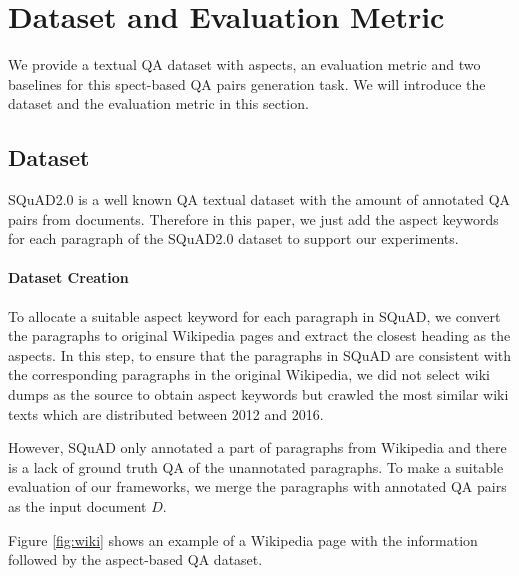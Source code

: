 \section{Dataset and Evaluation Metric}
\label{sec:data}

We provide a textual QA dataset with aspects, an evaluation metric and two baselines for this spect-based QA pairs generation task. We will introduce the dataset and the evaluation metric in this section.

\subsection{Dataset}
SQuAD2.0 is a well known QA textual dataset with the amount of annotated QA pairs from documents.
Therefore in this paper, we just add the aspect keywords for each paragraph of the SQuAD2.0 dataset to support our experiments.

\paragraph{Dataset Creation}
To allocate a suitable aspect keyword for each paragraph in SQuAD, we convert the paragraphs to original Wikipedia pages and extract the closest heading as the aspects.
In this step, to ensure that the paragraphs in SQuAD are consistent with the corresponding paragraphs in the original Wikipedia, 
we did not select wiki dumps as the source to obtain aspect keywords but crawled the most similar wiki texts which are distributed between 2012 and 2016.

However, SQuAD only annotated a part of paragraphs from Wikipedia and there is a lack of ground truth QA of the unannotated paragraphs.
To make a suitable evaluation of our frameworks, we merge the paragraphs with annotated QA pairs as the input document $D$.

Figure \ref{fig:wiki} shows an example of a Wikipedia page with the information followed by the aspect-based QA dataset.

